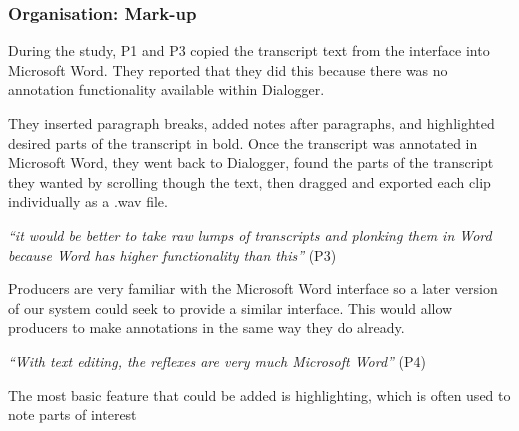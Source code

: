 



\subsubsection{Organisation: Mark-up}



During the study, P1 and P3 copied the transcript text from the interface into Microsoft Word. They
reported that they did this because there was no annotation functionality
available within Dialogger.

They inserted paragraph breaks, added notes after paragraphs, and
highlighted desired parts of the transcript in bold. Once the transcript was
annotated in Microsoft Word, they went back to Dialogger, found the parts of the
transcript they wanted by scrolling though the text, then dragged and
exported each clip individually as a .wav file.

\textit{``it would be better to take raw lumps of transcripts and plonking them
  in Word because Word has higher functionality than this''} (P3)

Producers are very familiar with the Microsoft Word interface so a later version of our
system could seek to provide a similar interface. This would allow producers to make annotations in the same way they
do already.

\textit{``With text editing, the reflexes are very much Microsoft Word''} (P4)

The most basic feature that could be added is highlighting, which is often used to note parts of interest

